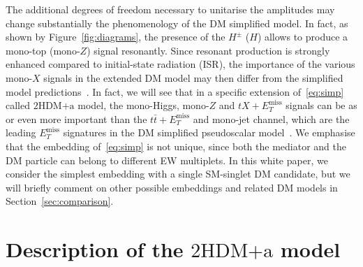 \documentclass[review]{elsarticle}
\newcommand{\MET}{\ensuremath{E_T^\mathrm{miss}}\xspace}
\newcommand{\hdma}{\ensuremath{\textrm{2HDM+a}}\xspace}
\begin{document}
The additional degrees of freedom necessary to unitarise the amplitudes may change substantially the phenomenology of the DM simplified model. In fact, as shown by Figure~\ref{fig:diagrams}, the presence of the $H^\pm$ ($H$) allows to produce a mono-top (mono-$Z$)  signal resonantly. Since resonant production is strongly enhanced compared to initial-state radiation (ISR), the  importance of the various mono-$X$ signals in the extended DM model may then differ from the simplified model predictions~\cite{Goncalves:2016iyg,Bauer:2017ota,Pani:2017qyd}. In fact, we will see that in a specific extension of~\eqref{eq:simp}  called \hdma model, the mono-Higgs, mono-$Z$ and $t X + \MET$ signals can be as or even more important than the $t \bar t + \MET$ and mono-jet channel, which are  the leading $\MET$ signatures in the DM simplified pseudoscalar model~\cite{Haisch:2012kf,Fox:2012ru,Buckley:2014fba,Harris:2014hga,Haisch:2015ioa,Mattelaer:2015haa,Backovic:2015soa,Neubert:2015fka,Arina:2016cqj,Haisch:2018bby,Haisch:2018hbm}. We emphasise that the embedding of~\eqref{eq:simp} is not unique, since  both the mediator and the DM particle can belong to different EW multiplets. In this white paper, we consider the simplest embedding with a single SM-singlet DM candidate,  but we will briefly comment on other possible embeddings and related DM models in Section~\ref{sec:comparison}.  


\section{Description of the \hdma model}
\label{sec:modeldescription}
\end{document}
